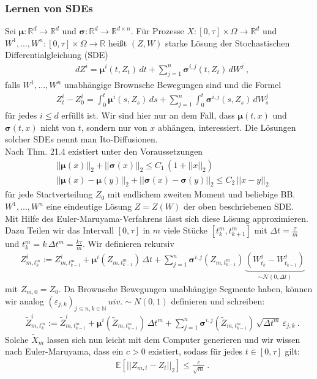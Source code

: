 \documentclass[12pt]{article}
\newcommand{\E}{\mathbb{E}}
\newcommand{\R}{\mathbb{R}}
\newcommand{\tZ}{\widetilde{Z}}
\newcommand{\tX}{\widetilde{X}}
\newcommand{\bmu}{\bm{\mu}}
\newcommand{\bsig}{\bm{\sigma}}
\newcommand{\N}{\mathbb{N}}
\begin{document}
	\subsubsection[Lernen von SDEs]{Lernen von SDEs}
	Sei $\bmu: \R^d \rightarrow \R^d$ und $\bsig: \R^d \rightarrow \R^{d \times n}$. Für Prozesse $X: [0,\tau] \times \Omega \rightarrow \R^d$ und $W^1,...,W^n : [0,\tau] \times \Omega \rightarrow \R$ heißt $(Z,W)$ starke Lösung der Stochastischen Differentialgleichung (SDE)
	\begin{align*}
		& dZ^i = \bmu^i(t,Z_t) \, dt + \sum\limits_{j=1}^n \bsig^{i,j}(t,Z_t) \, dW^j \ ,
	\end{align*}
	falls $W^1,...,W^n$ unabhängige Brownsche Bewegungen sind und die Formel
	\begin{align*}
		& Z_t^i - Z_0^i = \int_0^t \bmu^i(s,Z_s) \, ds + \sum\limits_{j=1}^n \int_0^t \bsig^{i,j}(s,Z_s) \, dW_s^j \tag{1}
	\end{align*}
	für jedes $i \leq d$ erfüllt ist. Wir sind hier nur an dem Fall, dass $\bmu(t,x)$ und $\bsig(t,x)$ nicht von $t$, sondern nur von $x$ abhängen, interessiert. Die Lösungen solcher SDEs nennt man Ito-Diffusionen.\\
	Nach \cite{PfaffiSkript} Thm. 21.4 existiert unter den Voraussetzungen
	\begin{align*}
		& ||\bmu(x)||_2 + ||\bsig(x)||_2 \leq C_1 \, (1+||x||_2)\\
		& ||\bmu(x)-\bmu(y)||_2 + ||\bsig(x)-\bsig(y)||_2 \leq C_2 \, ||x-y||_2 \tag{2}
	\end{align*}
	für jede Startverteilung $Z_0$ mit endlichem zweiten Moment und beliebige BB. $W^1,...,W^n$ eine eindeutige Lösung $Z = Z(W)$ der oben beschriebenen SDE.\\
	Mit Hilfe des Euler-Maruyama-Verfahrens lässt sich diese Lösung approximieren. Dazu Teilen wir das Intervall $[0,\tau]$ in $m$ viele Stücke $[t^m_k,t^m_{k+1}]$ mit $\Delta t = \frac{\tau}{m}$ und $t^m_k = k\, \Delta t^m = \frac{k\tau}{m}$. Wir definieren rekursiv
	\begin{align*}
		& Z^i_{m,t^m_k} := Z^i_{m,t^m_{k-1}} + \bmu^i(Z_{m,t^m_{k-1}}) \, \Delta t + \sum\limits_{j=1}^n \bsig^{i,j}(Z_{m,t^m_{k-1}}) \, \underbrace{(W^j_{t_k}-W^j_{t_{k-1}})}_{\sim \mathcal{N}(0,\Delta t)}
	\end{align*}
	mit $Z_{m,0} = Z_0$. Da Brownsche Bewegungen unabhängige Segmente haben, können wir analog $(\varepsilon_{j,k})_{j \leq n, k \in \N} \, uiv. \sim N(0,1)$ definieren und schreiben:
	\begin{align*}
		& \tZ^i_{m,t^m_k} := \tZ^i_{m,t^m_{k-1}} + \bmu^i(\tZ_{m,t^m_{k-1}}) \, \Delta t^m + \sum\limits_{j=1}^n \bsig^{i,j}(\tZ_{m,t^m_{k-1}}) \, \sqrt{\Delta t^m} \, \varepsilon_{j,k} \ .
	\end{align*}
	Solche $\tX_m$ lassen sich nun leicht mit dem Computer generieren und wir wissen nach Euler-Maruyama, dass ein $c > 0$ existiert, sodass für jedes $t \in [0,\tau]$ gilt:
	\begin{align*}
		& \E[||Z_{m,t} - Z_t||_2] \leq \frac{c}{\sqrt{m}} \ .
	\end{align*}
\end{document}
